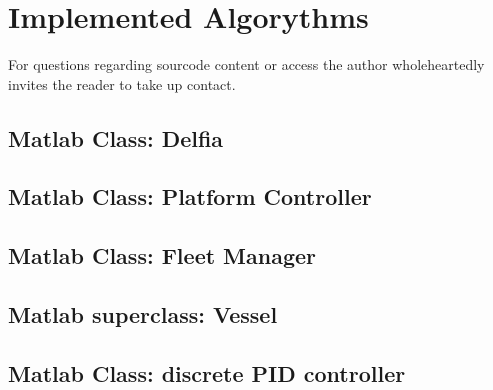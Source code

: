 \chapter{Implemented Algorythms}
\label{appendix:algorythsms}
For questions regarding sourcode content or access the author wholeheartedly invites the reader to take up contact. 

\section{Matlab Class: Delfia}

\begin{adjustwidth}{-15mm}{0mm}

\end{adjustwidth}
\newpage

\section{Matlab Class: Platform Controller}
\begin{adjustwidth}{-15mm}{0mm}

\end{adjustwidth}
\newpage

\section{Matlab Class: Fleet Manager}
\begin{adjustwidth}{-15mm}{0mm}

\end{adjustwidth}
\newpage

\section{Matlab superclass: Vessel }
\begin{adjustwidth}{-15mm}{0mm}

\end{adjustwidth}
\newpage

\section{Matlab Class: discrete PID controller}
\begin{adjustwidth}{-15mm}{0mm}

\end{adjustwidth}


